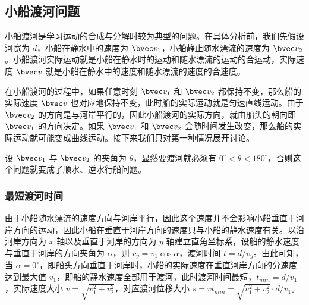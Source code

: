 


\subsection{小船渡河问题}

小船渡河是学习运动的合成与分解时较为典型的问题。在具体分析前，我们先假设河宽为 $d$，小船在静水中的速度为 $\bvec v_1$，小船静止随水漂流的速度为 $\bvec v_2$。小船渡河实际运动就是小船在静水时的运动和随水漂流的运动的合运动，实际速度 $\bvec v$ 就是小船在静水中的速度和随水漂流的速度的合速度。

在小船渡河的过程中，如果任意时刻 $\bvec v_1$ 和 $\bvec v_2$ 都保持不变，那么船的实际速度 $\bvec v$ 也对应地保持不变，此时船的实际运动就是匀速直线运动。由于 $\bvec v_2$ 的方向是与河岸平行的，因此小船渡河的实际方向，就由船头的朝向即 $\bvec v_1$ 的方向决定。如果 $\bvec v_1$ 和 $\bvec v_2$ 会随时间发生改变，那么船的实际运动就可能变成曲线运动。接下来我们只对第一种情况展开讨论。

设 $\bvec v_1$ 与 $\bvec v_2$ 的夹角为 $\theta$，显然要渡河就必须有 $0^\circ < \theta < 180^\circ $，否则这个问题就变成了顺水、逆水行船问题。

\subsubsection{最短渡河时间}

由于小船随水漂流的速度方向与河岸平行，因此这个速度并不会影响小船垂直于河岸方向的运动，因此小船在垂直于河岸方向的速度只与小船的静水速度有关。以沿河岸方向为 $x$ 轴以及垂直于河岸的方向为 $y$ 轴建立直角坐标系，设船的静水速度与垂直于河岸的方向夹角为 $\alpha$，则 $v_y = v_1 \cos \alpha$，渡河时间 $t=d/v_y$。由此可知，当 $\alpha = 0^\circ$，即船头方向垂直于河岸时，小船的实际速度在垂直河岸方向的分速度达到最大值 $v_1$，即船的静水速度全部用于渡河，此时渡河时间最短，$t_{min}=d/v_1$，实际速度大小 $v=\sqrt{v_1^2+v_2^2}$，对应渡河位移大小 $s=vt_{min}=\sqrt{v_1^2+v_2^2}\cdot d/v_1$。

